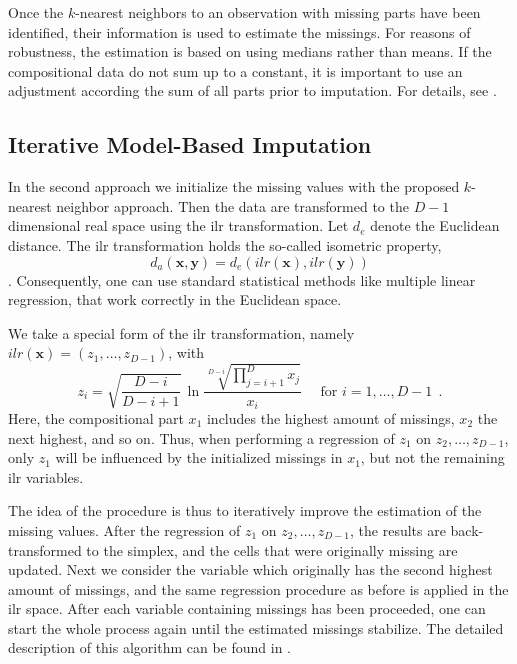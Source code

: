 \documentclass{scrartcl}
\newcommand{\m}[1]{\ensuremath{\mathbf{#1}}}
\begin{document}
Once the $k$-nearest neighbors to an observation with missing parts have been
identified, their information is used to estimate the missings. For reasons
of robustness, the estimation is based on using medians rather than means.
If the compositional
data do not sum up to a constant, it is important to use an adjustment according
the sum of all parts prior to imputation. For details, see \cite{Hron09}.


\subsection{Iterative Model-Based Imputation}

In the second approach we initialize the missing values with the proposed $k$-nearest 
neighbor approach. Then the data are transformed to the
$D-1$ dimensional real space using the ilr transformation.
Let $d_e$ denote the Euclidean distance. The ilr transformation holds the
so-called isometric property,
\begin{equation}
d_a(\m{x},\m{y})=d_e(ilr(\m{x}),ilr(\m{y})) 
\end{equation}
\citep{Egozcue05}. Consequently, one can use standard statistical methods 
like multiple linear regression, that work correctly in the Euclidean space.

We take a special form of the ilr transformation, namely
$ilr(\m{x})=(z_1,\dots,z_{D-1})$, with 
\begin{equation}
z_i=\sqrt{\frac{D-i}{D-i+1}}\,\ln\frac{\sqrt[D-i]{\prod_{j=i+1}^Dx_j}}{x_{i}}
\quad \mbox{ for } i=1,\ldots ,D-1 \ \ .
\end{equation}
Here, the compositional part $x_1$ includes the highest amount of missings,
$x_2$ the next highest, and so on. Thus, when performing a regression of 
$z_1$ on $z_2,\dots, z_{D-1}$, only $z_1$ will be influenced by the initialized
missings in $x_1$, but not the remaining ilr variables.

The idea of the procedure is thus to iteratively improve the estimation of the
missing values. After the regression of $z_1$ on $z_2,\dots, z_{D-1}$, the
results are back-transformed to the simplex, and the cells that were originally missing 
are updated. 
Next we consider the variable which originally has the second highest amount
of missings, and the same regression procedure as before is applied in the
ilr space. After each variable containing missings has been proceeded,
one can start the whole process again until
the estimated missings stabilize.
The detailed description of this algorithm can be found in \cite{Hron09}.
\end{document}
